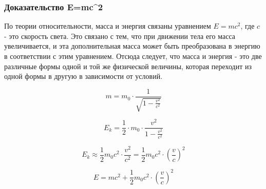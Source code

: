 \begin{frame}[label=frame_proof]
\frametitle{Доказательство E=mc^2 }
\scriptsize
По теории относительности, масса и энергия связаны уравнением $E=mc^2$, где $c$ - это скорость света. Это связано с тем, что при движении тела его масса увеличивается, и эта дополнительная масса может быть преобразована в энергию в соответствии с этим уравнением. Отсюда следует, что масса и энергия - это две различные формы одной и той же физической величины, которая переходит из одной формы в другую в зависимости от условий.

$$m=m_0\cdot\frac{1}{\sqrt{1-\frac{v^2}{c^2}}}$$

$$E_k=\frac{1}{2}\cdot m_0\cdot\frac{v^2}{1-\frac{v^2}{c^2}}$$

$$E_k\approx\frac{1}{2}m_0c^2\cdot\frac{v^2}{c^2}=\frac{1}{2}m_0c^2\cdot(\frac{v}{c})^2$$

$$E=mc^2+\frac{1}{2}m_0c^2\cdot(\frac{v}{c})^2$$

\hyperlink{frame_from}{}
\end{frame}

